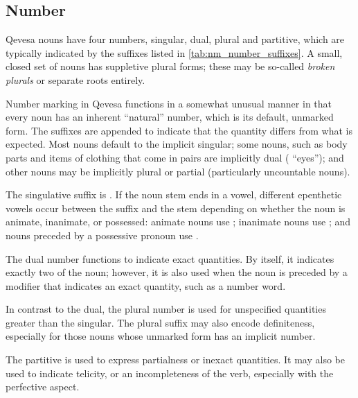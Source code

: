 \documentclass[grammar]{subfiles}
\begin{document}
\subsection{Number}
\label{ssec:nm_number}

Qevesa nouns have four numbers, singular, dual, plural and partitive, which are
typically indicated by the suffixes listed in \cref{tab:nm_number_suffixes}.  A
small, closed set of nouns has suppletive plural forms; these may be so-called 
\emph{broken plurals} or separate roots entirely. 

Number marking in Qevesa functions in a somewhat unusual manner in that every
noun has an inherent “natural” number, which is its default, unmarked form.
The suffixes are appended to indicate that the quantity differs from what is
expected.  Most nouns default to the implicit singular; some nouns, such as
body parts and items of clothing that come in pairs are implicitly dual
( “eyes”); and other nouns may be implicitly plural or partial
(particularly uncountable nouns). 



The singulative suffix is . If the noun stem ends in a vowel, different
epenthetic vowels occur between the suffix and the stem depending on whether
the noun is animate, inanimate, or possessed: animate nouns use ;
inanimate nouns use ; and nouns preceded by a possessive
pronoun use .

The dual number functions to indicate exact quantities.  By itself, it
indicates exactly two of the noun; however, it is also used when the noun is
preceded by a modifier that indicates an exact quantity, such as a number word.

In contrast to the dual, the plural number is used for unspecified quantities
greater than the singular.  The plural suffix may also encode definiteness,
especially for those nouns whose unmarked form has an implicit number. 

The partitive is used to express partialness or inexact quantities.  It may
also be used to indicate telicity, or an incompleteness of the verb, especially
with the perfective aspect.
\end{document}
